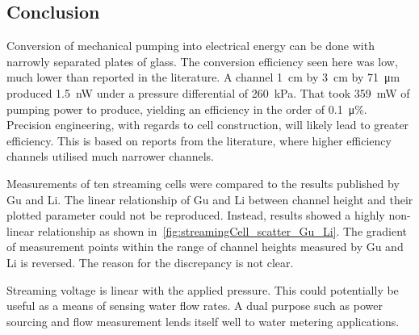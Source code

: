 







\subsection{Conclusion}
Conversion of mechanical pumping into electrical energy can be done with narrowly separated plates of glass.
The conversion efficiency seen here was low, much lower than reported in the literature.
A channel \SI{1}{\centi\meter} by \SI{3}{\centi\meter} by \SI{71}{\micro\meter} produced \SI{1.5}{\nano\watt} under a pressure differential of \SI{260}{\kilo\pascal}.
That took \SI{359}{\milli\watt} of pumping power to produce, yielding an efficiency in the order of \SI{0.1}{\micro\percent}.
Precision engineering, with regards to cell construction, will likely lead to greater efficiency.
This is based on reports from the literature, where higher efficiency channels utilised much narrower channels.

Measurements of ten streaming cells were compared to the results published by Gu and Li.
The linear relationship of Gu and Li between channel height and their plotted parameter could not be reproduced.
Instead, results showed a highly non-linear relationship as shown in~\cref{fig:streamingCell_scatter_Gu_Li}.
The gradient of measurement points within the range of channel heights measured by Gu and Li is reversed.
The reason for the discrepancy is not clear.

Streaming voltage is linear with the applied pressure.
This could potentially be useful as a means of sensing water flow rates.
A dual purpose such as power sourcing and flow measurement lends itself well to water metering applications.

